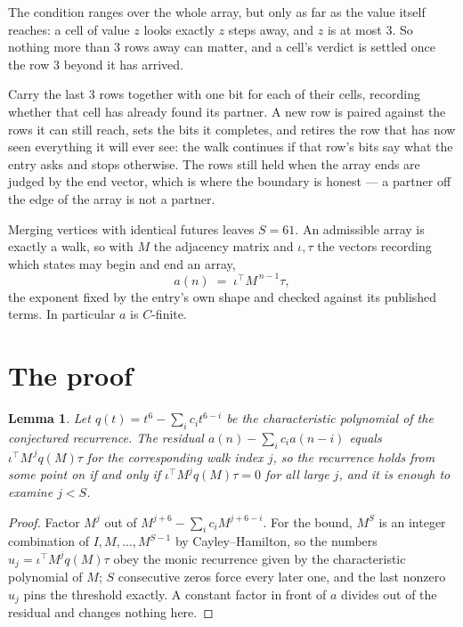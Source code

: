 \documentclass[11pt,a4paper]{article}
\theoremstyle{plain}
\newtheorem{lemma}[theorem]{Lemma}
\theoremstyle{definition}
\begin{document}
The condition ranges over the whole array, but only as far as the value itself reaches: a cell of value $z$ looks exactly $z$ steps away, and $z$ is at most $3$. So nothing more than $3$ rows away can matter, and a cell's verdict is settled once the row $3$ beyond it has arrived.

Carry the last $3$ rows together with one bit for each of their cells, recording whether that cell has already found its partner. A new row is paired against the rows it can still reach, sets the bits it completes, and retires the row that has now seen everything it will ever see: the walk continues if that row's bits say what the entry asks and stops otherwise. The rows still held when the array ends are judged by the end vector, which is where the boundary is honest --- a partner off the edge of the array is not a partner.

Merging vertices with identical futures leaves $S=61$. An admissible array is exactly a walk, so with $M$ the adjacency matrix and $\iota,\tau$ the vectors recording which states may begin and end an array,
\[
a(n)\;=\;\iota^{\!\top}M^{\,n-1}\tau ,
\]
the exponent fixed by the entry's own shape and checked against its published terms. In
particular $a$ is $C$-finite.

\section{The proof}

\begin{lemma}\label{lem:crit}
Let $q(t)=t^{6}-\sum_i c_it^{6-i}$ be the characteristic polynomial of the
conjectured recurrence. The residual $a(n)-\sum_ic_ia(n-i)$ equals
$\iota^{\!\top}M^{\,j}q(M)\tau$ for the corresponding walk index $j$, so the recurrence
holds from some point on if and only if $\iota^{\!\top}M^{j}q(M)\tau=0$ for all large $j$,
and it is enough to examine $j<S$.
\end{lemma}

\begin{proof}
Factor $M^{j}$ out of $M^{j+6}-\sum_ic_iM^{j+6-i}$. For the bound, $M^{S}$
is an integer combination of $I,M,\dots,M^{S-1}$ by Cayley--Hamilton, so the numbers
$u_j=\iota^{\!\top}M^{j}q(M)\tau$ obey the monic recurrence given by the characteristic
polynomial of $M$; $S$ consecutive zeros force every later one, and the last nonzero $u_j$
pins the threshold exactly. A constant factor in front of $a$ divides out of the residual and
changes nothing here.
\end{proof}
\end{document}
